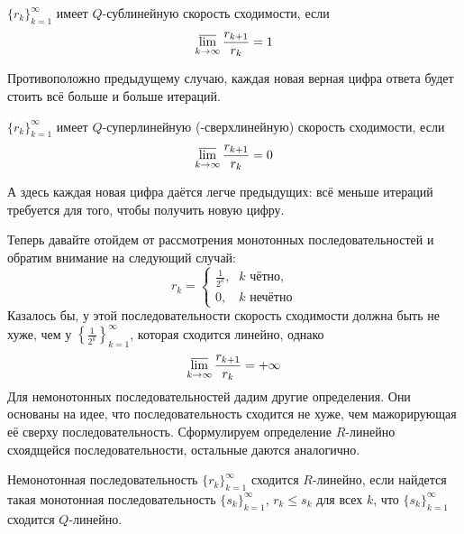 \documentclass[a4paper, 12pt]{article}
\begin{document}
\begin{Def}
    $\{r_k\}_{k=1}^{\infty}$ имеет $Q$-сублинейную скорость сходимости, если
    $$\varlimsup_{k \rightarrow \infty} \frac{r_{k+1}}{r_k} = 1$$
\end{Def}

Противоположно предыдущему случаю, каждая новая верная цифра ответа будет стоить всё больше и больше итераций.

\begin{Def}
    $\{r_k\}_{k=1}^{\infty}$ имеет $Q$-суперлинейную (-сверхлинейную) скорость сходимости, если
    $$\varlimsup_{k \rightarrow \infty} \frac{r_{k+1}}{r_k} = 0$$
\end{Def}

А здесь каждая новая цифра даётся легче предыдущих: всё меньше итераций требуется для того, чтобы получить новую цифру.

Теперь давайте отойдем от рассмотрения монотонных последовательностей и обратим внимание на следующий случай:
\begin{equation*}
    r_k = 
    \begin{cases}
        \frac{1}{2^k}\text{,}& k \text{ чётно,}\\
        0\text{,}& k \text{ нечётно}
    \end{cases}
\end{equation*}
Казалось бы, у этой последовательности скорость сходимости должна быть не хуже, чем у $\left\{\frac{1}{2^k}\right\}_{k=1}^{\infty}$, которая сходится линейно, однако $$\varlimsup_{k \rightarrow \infty} \frac{r_{k+1}}{r_k} = +\infty$$
Для немонотонных последовательностей дадим другие определения. Они основаны на идее, что последовательность сходится не хуже, чем мажорирующая её сверху последовательность. Сформулируем определение $R$-линейно схоядщейся последовательности, остальные даются аналогично.

\begin{Def}
    Немонотонная последовательность $\{r_k\}_{k=1}^{\infty}$ сходится $R$-линейно, если найдется такая монотонная последовательность $\{s_k\}_{k=1}^{\infty}$, $r_k \leq s_k$ для всех $k$, что $\{s_k\}_{k=1}^{\infty}$ сходится $Q$-линейно.
\end{Def}
\end{document}

